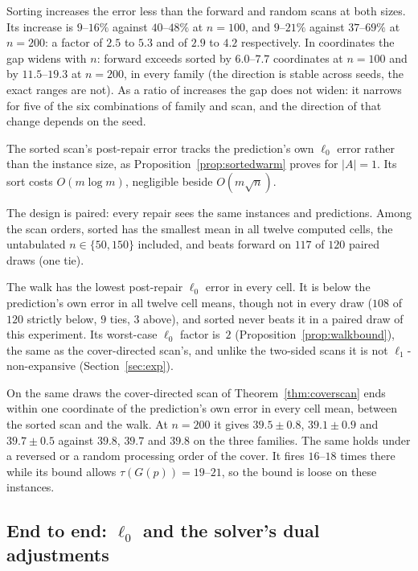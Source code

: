 Sorting increases the error less than the forward and random scans at both sizes. Its increase is $9$--$16\%$ against
$40$--$48\%$ at $n = 100$, and $9$--$21\%$ against $37$--$69\%$ at $n = 200$: a factor of $2.5$ to
$5.3$ and of $2.9$ to $4.2$ respectively. In coordinates the gap widens with $n$: forward exceeds
sorted by $6.0$--$7.7$ coordinates at $n = 100$ and by $11.5$--$19.3$ at $n = 200$, in every
family (the direction is stable across seeds, the exact ranges are not). As a ratio of increases the gap does
not widen: it narrows for five of the six combinations of family and scan, and the direction of
that change depends on the seed.

The sorted scan's post-repair error tracks the prediction's own $\ell_0$
error rather than the instance size, as Proposition~\ref{prop:sortedwarm} proves for $|A| = 1$.
Its sort costs $O(m \log m)$, negligible beside $O(m\sqrt{n})$.

The design is paired: every
repair sees the same instances and predictions. Among the scan orders, sorted has the smallest
mean in all twelve computed cells, the untabulated $n \in \{50, 150\}$ included, and beats forward
on $117$ of $120$ paired draws (one tie).

The walk has the lowest post-repair $\ell_0$ error in
every cell. It is below the prediction's own error in all twelve cell means, though not in every
draw ($108$ of $120$ strictly below, $9$ ties, $3$ above), and sorted never beats it in a paired
draw of this experiment. Its worst-case $\ell_0$ factor is~$2$ (Proposition~\ref{prop:walkbound}), the same
as the cover-directed scan's, and unlike the two-sided scans it is not $\ell_1$-non-expansive
(Section~\ref{sec:exp}).

On the same draws the cover-directed scan of
Theorem~\ref{thm:coverscan} ends within one coordinate of the prediction's own error in every
cell mean, between the sorted scan and the walk. At $n = 200$ it gives $39.5 \pm 0.8$,
$39.1 \pm 0.9$ and $39.7 \pm 0.5$ against $39.8$, $39.7$ and $39.8$ on the three families.
The same holds under a reversed or a random processing order of the cover. It fires $16$--$18$
times there while its bound allows $\tau(G(p)) = 19$--$21$, so the bound is loose on these
instances.

\subsection*{End to end: \texorpdfstring{$\ell_0$}{l0} and the solver's dual adjustments}

